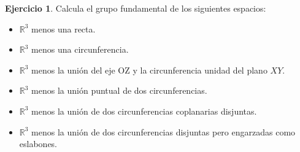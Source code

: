 \documentclass{article}
\theoremstyle{plain}
\theoremstyle{definition}
\newtheorem{exercise}{Ejercicio}
\begin{document}
\newpage

\begin{exercise}

Calcula el grupo fundamental de los siguientes espacios:

\begin{itemize}

\item $\mathbb{R}^3$ menos una recta.

\item $\mathbb{R}^3$ menos una circunferencia.

\item $\mathbb{R}^3$ menos la uni\'on del eje OZ y la circunferencia unidad del plano $XY$.

\item $\mathbb{R}^3$ menos la uni\'on puntual de dos circunferencias.

\item $\mathbb{R}^3$ menos la uni\'on de dos circunferencias coplanarias disjuntas.

\item $\mathbb{R}^3$ menos la uni\'on de dos circunferencias disjuntas pero engarzadas como eslabones.



\end{itemize}

\end{exercise}
\end{document}
